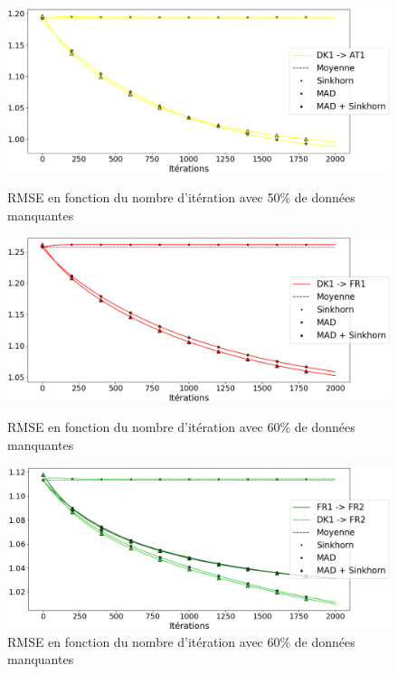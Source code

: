 \documentclass[acmsmall, natbib=false, nonacm]{acmart}
\begin{document}
\begin{figure}[H]
    \begin{minipage}[b]{0.4\linewidth}
		\centering \includegraphics[scale=0.14]{images/50_ar_AT1.png}
		\caption{RMSE en fonction du nombre d'itération avec 50\% de données manquantes}
	\end{minipage}\hfill
    \begin{minipage}[b]{0.4\linewidth}
		\centering \includegraphics[scale=0.14]{images/60_ar_FR1.png}
		\caption{RMSE en fonction du nombre d'itération avec 60\% de données manquantes}
	\end{minipage}\hfill
    \begin{minipage}[b]{0.4\linewidth}
		\centering \includegraphics[scale=0.14]{images/60_ar_FR2.png}
		\caption{RMSE en fonction du nombre d'itération avec 60\% de données manquantes}
	\end{minipage}
\end{figure}
\end{document}
